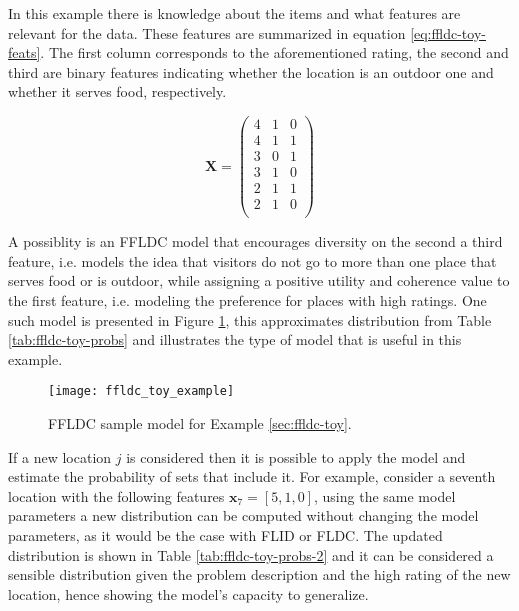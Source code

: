 In this example there is knowledge about the items and what features are relevant for the data. These features are summarized in equation \eqref{eq:ffldc-toy-feats}. The first column corresponds to the aforementioned rating, the second and third are binary features indicating whether the location is an outdoor one and whether it serves food, respectively.

\begin{equation}
  \mathbf{X} = \left(
    \begin{array}{ccc}
      4 & 1 & 0 \\
      4 & 1 & 1 \\
      3 & 0 & 1 \\
      3 & 1 & 0 \\
      2 & 1 & 1 \\
      2 & 1 & 0  \\
     \end{array}
  \right)
  \label{eq:ffldc-toy-feats}
\end{equation}

A possiblity is an FFLDC model that encourages diversity on the second a third feature, i.e. models the idea that visitors do not go to more than one place that serves food or is outdoor, while assigning a positive utility and coherence value to the first feature, i.e. modeling the preference for places with high ratings. One such model is presented in Figure \ref{fig:ffldc-toy-all-weights}, this approximates distribution from Table \ref{tab:ffldc-toy-probs} and illustrates the type of model that is useful in this example.

\begin{figure}
  \centering
  \texttt{[image: ffldc\_toy\_example]}
  \caption{FFLDC sample model for Example \ref{sec:ffldc-toy}.}
  \label{fig:ffldc-toy-all-weights}
\end{figure}

If a new location $j$ is considered then it is possible to apply the model and estimate the probability of sets that include it. For example, consider a seventh location with the following features $\mathbf{x}_{7} = [5, 1, 0]$, using the same model parameters a new distribution can be computed without changing the model parameters, as it would be the case with FLID or FLDC. The updated distribution is shown in Table \ref{tab:ffldc-toy-probs-2} and it can be considered a sensible distribution given the problem description and the high rating of the new location, hence showing the model's capacity to generalize.

